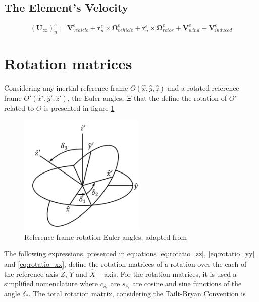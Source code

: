 \subsection{The Element's Velocity}
\label{section:element_velocity}


\begin{equation}
    \left(\mathbf{U}_\infty\right)^e_n = \mathbf{V}^e_{vehicle} + \mathbf{r}_n^e \times \boldsymbol{\Omega}_{vehicle}^e + \mathbf{r}_n^e \times \boldsymbol{\Omega}_{rotor}^e + \mathbf{V}_{wind}^e + \mathbf{V}_{induced}^e
    \label{eq:elemets_velocity}
\end{equation}


\section{Rotation matrices}
\label{section:rotation_matrices}

Considering any inertial reference frame $O(\hat{x},\hat{y},\hat{z})$ and a rotated reference frame $O'(\hat{x}',\hat{y}',\hat{z}')$, the Euler angles, $\Xi$ that the define the rotation of $O'$ related to $O$ is presented in figure \ref{fig:rotation_frames_img}

\begin{figure}[!htb]
    \centering
    \includegraphics[width=6cm]{Figures/background/rotation_matrices/rotation_frames.png}
    \caption{Reference frame rotation Euler angles, adapted from \cite{schwab_how_2006}}
    \label{fig:rotation_frames_img}
\end{figure}

The following expressions, presented in equations \ref{eq:rotatio_zz}, \ref{eq:rotatio_yy} and \ref{eq:rotatio_xx}, define the rotation matrices of a rotation over the each of the reference axis $\hat{Z}$, $\hat{Y}$ and $\hat{X}-$axis. For the rotation matrices, it is used a simplified nomenclature where $c_{\delta_{*}}$ are $s_{\delta_{*}}$ are cosine and sine functions of the angle $\delta_{*}$. The total rotation matrix, considering the Tailt-Bryan Convention is

